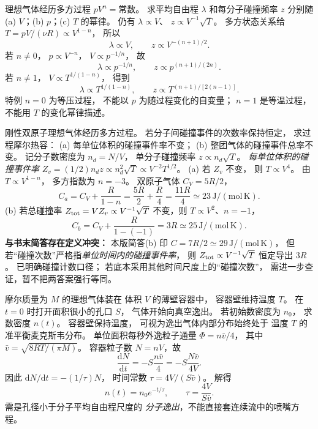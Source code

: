 理想气体经历多方过程
$pV^n=\text{常数}$。
求平均自由程 $\lambda$
和每分子碰撞频率 $z$
分别随
(a) $V$；(b) $p$；(c) $T$
的幂律。
\exsolution
仍有
$\lambda\propto V$、
$z\propto V^{-1}\sqrt T$。
多方状态关系给
$T=pV/(\nu R)\propto V^{1-n}$，
所以
\[
\boxed{\lambda\propto V,\qquad
z\propto V^{-(n+1)/2}}.
\]
若 $n\ne0$，
$p\propto V^{-n}$，
$V\propto p^{-1/n}$，
故
\[
\boxed{\lambda\propto p^{-1/n},\qquad
z\propto p^{(n+1)/(2n)}}.
\]
若 $n\ne1$，
$V\propto T^{1/(1-n)}$，
得到
\[
\boxed{\lambda\propto T^{1/(1-n)},\qquad
z\propto T^{(n+1)/[2(n-1)]}}.
\]
\excheck 特例 $n=0$ 为等压过程，
不能以 $p$ 为随过程变化的自变量；
$n=1$ 是等温过程，
不能用 $T$ 的变化幂律描述。

刚性双原子理想气体经历多方过程。
若分子间碰撞事件的次数率保持恒定，
求过程摩尔热容：
(a) 每单位体积的碰撞事件率不变；
(b) 整团气体的碰撞事件总率不变。
\exsolution
记分子数密度为 $n_d=N/V$，
单分子碰撞频率
$z\propto n_d\sqrt T$。
\emph{每单位体积的碰撞事件率}
$Z_v=(1/2)n_dz
\propto n_d^2\sqrt T
\propto V^{-2}T^{1/2}$。
(a) 若 $Z_v$ 不变，
则 $T\propto V^4$。
由 $T\propto V^{1-n}$，
多方指数为 $n=-3$。
双原子气体 $C_V=5R/2$，
\[
\boxed{C_a=C_V+\frac R{1-n}
=\frac{5R}{2}+\frac R4
=\frac{11R}{4}\simeq23\,\mathrm{J/(mol\,K)}}.
\]
(b) 若总碰撞率
$Z_{\rm tot}=VZ_v\propto V^{-1}\sqrt T$
不变，则
$T\propto V^2$、$n=-1$，
\[
\boxed{C_b=C_V+\frac R{1-(-1)}
=3R\simeq25\,\mathrm{J/(mol\,K)}}.
\]
\excheck \textbf{与书末简答存在定义冲突：}
本版简答(b) 印 $C=7R/2\simeq29\,\mathrm{J/(mol\,K)}$，
但若“碰撞次数”严格指\emph{单位时间内的碰撞事件率}，
则 $Z_{\rm tot}\propto V^{-1}\sqrt T$ 恒定导出 $3R$。
已明确碰撞计数口径；
若底本采用其他时间尺度上的“碰撞次数”，
需进一步查证，暂不把两答案强行等同。

摩尔质量为 $M$ 的理想气体装在
体积 $V$ 的薄壁容器中，
容器壁维持温度 $T$。
在 $t=0$ 时打开面积很小的孔口 $S$，
气体开始向真空逸出。
若初始数密度为 $n_0$，
求数密度 $n(t)$。
\exsolution
容器壁保持温度，
可视为逸出气体内部分布始终处于
温度 $T$ 的准平衡麦克斯韦分布。
单位面积每秒外逸粒子通量
$\Phi=n\bar v/4$，
其中
$\bar v=\sqrt{8RT/(\pi M)}$。
容器粒子数 $N=nV$，故
\[
\frac{\mathrm dN}{\mathrm dt}
=-S\frac{n\bar v}{4}
=-S\frac{N\bar v}{4V}.
\]
因此
$\mathrm dN/\mathrm dt=-(1/\tau)N$，
时间常数
$\tau=4V/(S\bar v)$。
解得
\[
\boxed{n(t)=n_0e^{-t/\tau}},\qquad
\boxed{\tau=\frac{4V}{S\bar v}}.
\]
\excheck 需是孔径小于分子平均自由程尺度的
\emph{分子逸出}，不能直接套连续流中的喷嘴方程。

